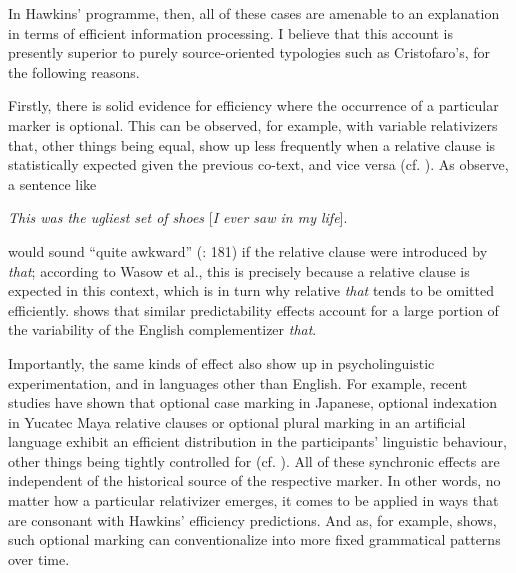 \documentclass[output=paper]{langsci/langscibook}
\begin{document}
In Hawkins’ programme, then, all of these cases are amenable to an explanation in terms of efficient information processing. I believe that this account is presently superior to purely source-oriented typologies such as Cristofaro’s, for the following reasons.

Firstly, there is solid evidence for efficiency where the occurrence of a particular marker is optional. This can be observed, for example, with variable relativizers that, other things being equal, show up less frequently when a relative clause is statistically expected given the previous co-text, and vice versa (cf. \citealt{WasowEtAl2011}). As \citet{FoxThompson2007} observe, a sentence like

\ea
{\textit{This was the ugliest set of shoes} [\textit{I ever saw in my life}].} \\
\z

would sound “quite awkward” (\citealt{WasowEtAl2011}: 181) if the relative clause were introduced by \textit{that}; according to Wasow et al., this is precisely because a relative clause is expected in this context, which is in turn why relative \textit{that} tends to be omitted efficiently. \citet{Jaeger2010} shows that similar predictability effects account for a large portion of the variability of the English complementizer \textit{that}. 

Importantly, the same kinds of effect also show up in psycholinguistic experimentation, and in languages other than English. For example, recent studies have shown that optional case marking in Japanese, optional indexation in Yucatec Maya relative clauses or optional plural marking in an artificial language exhibit an efficient distribution in the participants’ linguistic behaviour, other things being tightly controlled for (cf. \citealt{KurumadaJaeger2015,NorcliffeJaeger2016,KurumadaGrimm2017}). All of these synchronic effects are independent of the historical source of the respective marker. In other words, no matter how a particular relativizer emerges, it comes to be applied in ways that are consonant with Hawkins’ efficiency predictions. And as, for example, \citet{Seržant2019tv} shows, such optional marking can conventionalize into more fixed grammatical patterns over time.
\end{document}
